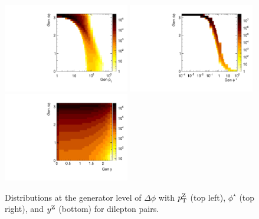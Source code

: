 \begin{figure}
	\centering
	\includegraphics[width=0.49\textwidth]{figures/zpt/ptVdphi.pdf}
	\includegraphics[width=0.49\textwidth]{figures/zpt/phiVdphi.pdf}
	\includegraphics[width=0.49\textwidth]{figures/zpt/rapVdphi.pdf}
	\caption{Distributions at the generator level of $\Delta\phi$ with $p_{\mathrm{T}}^{\mathrm{Z}}$ (top left), $\phi^\star$ (top right), and $y^{\mathrm{Z}}$ (bottom) for dilepton pairs.}
	\label{fig:gendist2}
\end{figure}

